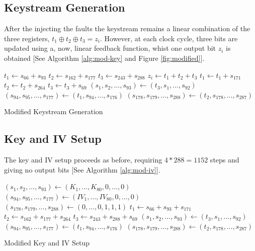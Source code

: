 \documentclass[conference]{IEEEtran}
\begin{document}
\subsection{Keystream Generation}

After the injecting the faults the keystream remains a linear combination of the three registers, $t_1 \oplus t_2 \oplus t_3 = z_i$. However, at each clock cycle, three bits are updated using a, now, linear feedback function, whist one output bit $z_i$ is obtained [See Algorithm \ref{alg:mod-key} and Figure \ref{fig:modified}].

\begin{algorithm}[H]
\begin{algorithmic}[1]
 
\State $t_1 \gets s_{66} + s_{93}$
\State $t_2 \gets s_{162} + s_{177}$
\State $t_3 \gets s_{243} + s_{288}$
\State
\State $z_i \gets t_1 + t_2 + t_3$
\State
\State $t_1 \gets t_1 + s_{171}$
\State $t_2 \gets t_2 + s_{264}$
\State $t_3 \gets t_3 + s_{69}$
\State
\State $(s_1,s_2,\dots,s_{93}) \gets (t_3,s_1,\dots,s_{92})$
\State $(s_{94},s_{95},\dots,s_{177}) \gets (t_1,s_{94},\dots,s_{176})$
\State $(s_{178},s_{179},\dots,s_{288}) \gets (t_2,s_{178},\dots,s_{287})$
\EndFor
\end{algorithmic}
\caption{Modified Keystream Generation} \label{alg:mod-key}
\end{algorithm}

\subsection{Key and IV Setup}

The key and IV setup proceeds as before, requiring $4*288=1152$ steps and giving no output bits [See Algorithm \ref{alg:mod-iv}].

\begin{algorithm}[H]
\begin{algorithmic}[1]
\State $(s_1,s_2,\dots,s_{93}) \gets (K_1,\dots,K_{80},0,\dots,0)$
\State $(s_{94},s_{95},\dots,s_{177}) \gets (IV_1,\dots,IV_{80},0,\dots,0)$
\State $(s_{178},s_{179},\dots,s_{288}) \gets (0,\dots,0,1,1,1)$
\State
{}
\State $t_1 \gets s_{66} + s_{93} + s_{171}$
\State $t_2 \gets s_{162} + s_{177} + s_{264}$
\State $t_3 \gets s_{243} + s_{288}+ s_{69}$
\State
\State $(s_1,s_2,\dots,s_{93}) \gets (t_3,s_1,\dots,s_{92})$
\State $(s_{94},s_{95},\dots,s_{177}) \gets (t_1,s_{94},\dots,s_{176})$
\State $(s_{178},s_{179},\dots,s_{288}) \gets (t_2,s_{178},\dots,s_{287})$
\EndFor
\end{algorithmic}
\caption{Modified Key and IV Setup} \label{alg:mod-iv}
\end{algorithm}
\end{document}
